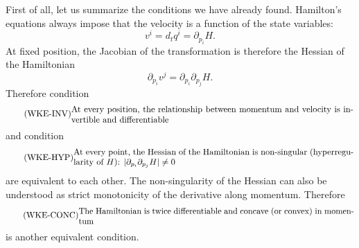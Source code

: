 First of all, let us summarize the conditions we have already found. Hamilton's equations always impose that the velocity is a function of the state variables:
\begin{equation}
	v^i = d_t q^i = \partial_{p_i} H.
\end{equation}
At fixed position, the Jacobian of the transformation is therefore the Hessian of the Hamiltonian
\begin{equation}
	\partial_{p_i} v^j = \partial_{p_i}\partial_{p_j} H.
\end{equation}
Therefore condition
\begin{equation}\label{rp-cm-wke-condVelocityFromMomentum}
	\tag{WKE-INV}
	\eqtext{At every position, the relationship between momentum and velocity is invertible and differentiable}
\end{equation}
and condition
\begin{equation}\label{rp-cm-wke-condHyperregularity}
	\tag{WKE-HYP}
	\eqtext{At every point, the Hessian of the Hamiltonian is non-singular (hyperregularity of $H$): $|\partial_{p_i}\partial_{p_j} H|\neq 0$}
\end{equation}
are equivalent to each other. The non-singularity of the Hessian can also be understood as strict monotonicity of the derivative along momentum. Therefore 
\begin{equation}\label{rp-cm-wke-condConcavity}
	\tag{WKE-CONC}
	\eqtext{The Hamiltonian is twice differentiable and concave (or convex) in momentum}
\end{equation}
is another equivalent condition.

